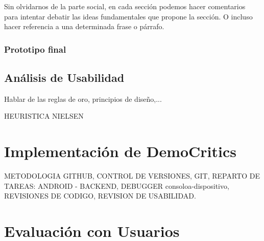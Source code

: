Sin olvidarnos de la parte social, en cada sección podemos hacer comentarios para intentar debatir las ideas fundamentales que propone la sección. O incluso hacer referencia a una determinada frase o párrafo.

\subsubsection{Prototipo final}

\subsection{Análisis de Usabilidad}

Hablar de las reglas de oro, principios de diseño,...

HEURISTICA NIELSEN

\section{Implementación de DemoCritics}

METODOLOGIA GITHUB, CONTROL DE VERSIONES, GIT, REPARTO DE TAREAS: ANDROID - BACKEND, DEBUGGER consoloa-dispositivo, REVISIONES DE CODIGO, REVISION DE USABILIDAD.

\section{Evaluación con Usuarios}